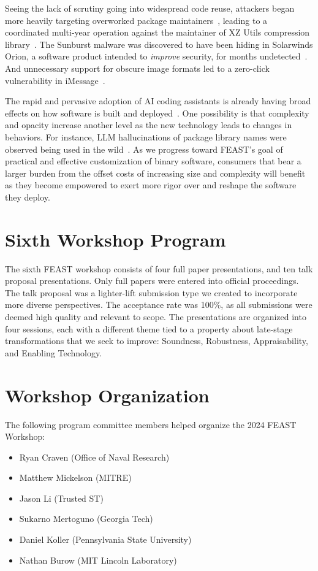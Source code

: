 \documentclass[sigconf]{acmart}
\begin{document}
Seeing the lack of
scrutiny going into widespread code reuse, attackers began more
heavily targeting overworked package maintainers~\cite{duan2021}, leading to a
coordinated multi-year operation against the maintainer of XZ Utils compression
library~\cite{xzutils}. The Sunburst malware was discovered to have been hiding
in Solarwinds Orion, a software product intended to \emph{improve} security, for months undetected~\cite{sunburst}. And
unnecessary support for obscure image formats led to a zero-click vulnerability
in iMessage~\cite{forcedentry}.

The rapid and pervasive adoption of AI coding assistants is already having broad
effects on how software is built and deployed~\cite{klemmer2024}.  One
possibility is that complexity and opacity increase another level as the new technology
leads to changes in behaviors.  For instance, LLM hallucinations of package
library names were observed being used in the wild~\cite{lanyado2024}. As we
progress toward FEAST's goal of practical and effective customization of binary
software, consumers that bear a larger burden from the offset costs of
increasing size and complexity will benefit as they become empowered to exert
more rigor over and reshape the software they deploy.

\section{Sixth Workshop Program}
The sixth FEAST workshop consists of four full paper presentations, and ten talk
proposal presentations.  Only full papers were entered into official proceedings.
The talk proposal was a lighter-lift submission type we created 
to incorporate more diverse perspectives.  The acceptance rate was 100\%,
as all submissions were deemed high quality and relevant to scope.
The presentations are organized into four sessions, each with a different theme
tied to a property about late-stage transformations that we seek to improve:
Soundness, Robustness, Appraisability, and Enabling Technology.

\section{Workshop Organization}
The following program committee members helped organize the 2024 FEAST Workshop:
\begin{itemize}
  \item Ryan Craven (Office of Naval Research)
  \item Matthew Mickelson (MITRE)
  \item Jason Li (Trusted ST)
  \item Sukarno Mertoguno (Georgia Tech)
  \item Daniel Koller (Pennsylvania State University)
  \item Nathan Burow (MIT Lincoln Laboratory)
\end{itemize}
\end{document}
